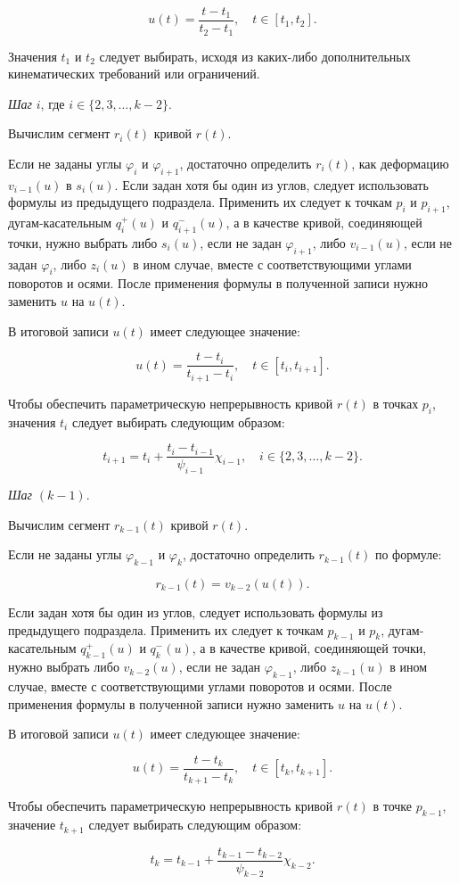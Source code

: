 $$
u(t)=\frac{t-t_1}{t_2-t_1}, \quad t \in [t_1,t_2].
$$

Значения $t_1$ и $t_2$ следует выбирать, исходя из каких-либо дополнительных кинематических требований или ограничений.

\bigskip
\textit{Шаг} $i$, где $i \in \{2,3,\dots,k-2\}$.

Вычислим сегмент $r_i(t)$ кривой $r(t)$.

Если не заданы углы $\varphi_i$ и $\varphi_{i+1}$, достаточно определить $r_i(t)$, как деформацию $v_{i-1}(u)$ в $s_i(u)$.
Если задан хотя бы один из углов, следует использовать формулы из предыдущего подраздела. Применить их следует к
точкам $p_i$ и $p_{i+1}$, дугам-касательным $q_i^+(u)$ и $q_{i+1}^-(u)$, а в качестве кривой, соединяющей точки,
нужно выбрать либо $s_i(u)$, если не задан $\varphi_{i+1}$, либо $v_{i-1}(u)$, если не задан $\varphi_i$, либо $z_i(u)$
в ином случае, вместе с соответствующими углами поворотов и осями. После применения формулы в полученной записи нужно
заменить $u$ на $u(t)$.

В итоговой записи $u(t)$ имеет следующее значение:

$$
u(t)=\frac{t-t_i}{t_{i+1}-t_i}, \quad t \in [t_i,t_{i+1}].
$$

Чтобы обеспечить параметрическую непрерывность кривой $r(t)$ в точках $p_i$, значения $t_i$ следует выбирать
следующим образом:

$$
t_{i+1}=t_i+\frac{t_i-t_{i-1}}{\psi_{i-1}}\chi_{i-1}, \quad i \in \{2,3,\dots,k-2\}.
$$

\bigskip
\textit{Шаг} $(k-1)$.

Вычислим сегмент $r_{k-1}(t)$ кривой $r(t)$.

Если не заданы углы $\varphi_{k-1}$ и $\varphi_k$, достаточно определить $r_{k-1}(t)$ по формуле:

$$
r_{k-1}(t)=v_{k-2}(u(t)).
$$

Если задан хотя бы один из углов, следует использовать формулы из предыдущего подраздела. Применить их следует к
точкам $p_{k-1}$ и $p_k$, дугам-касательным $q_{k-1}^+(u)$ и $q_k^-(u)$, а в качестве кривой, соединяющей точки,
нужно выбрать либо $v_{k-2}(u)$, если не задан $\varphi_{k-1}$, либо $z_{k-1}(u)$ в ином случае, вместе с соответствующими
углами поворотов и осями. После применения формулы в полученной записи нужно заменить $u$ на $u(t)$.

В итоговой записи $u(t)$ имеет следующее значение:

$$
u(t)=\frac{t-t_k}{t_{k+1}-t_k}, \quad t \in [t_k,t_{k+1}].
$$

Чтобы обеспечить параметрическую непрерывность кривой $r(t)$ в точке $p_{k-1}$, значение $t_{k+1}$ следует выбирать
следующим образом:

$$
t_k=t_{k-1}+\frac{t_{k-1}-t_{k-2}}{\psi_{k-2}}\chi_{k-2}.
$$
